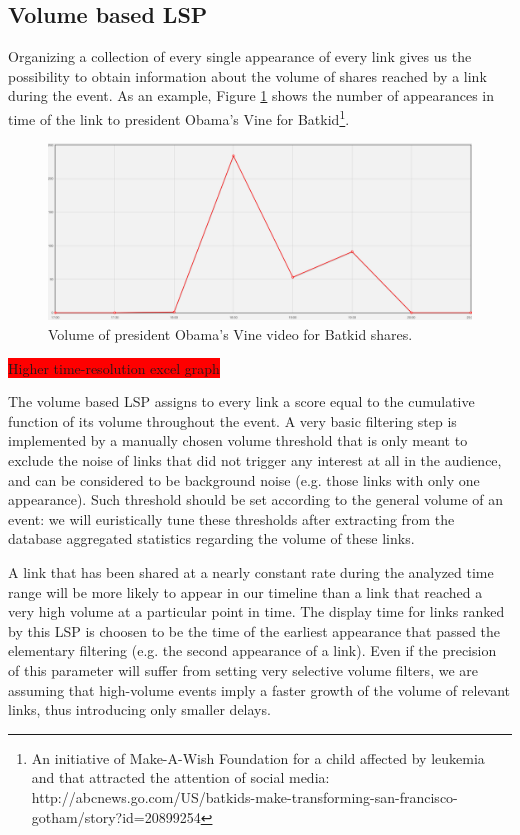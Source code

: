\documentclass{sig-alternate}
\newcommand{\todo}[1]{\colorbox{red}{#1}}
\begin{document}
\subsection{Volume based LSP}
\label{sec:volume_based_links_selection}
Organizing a collection of every single appearance of every link gives us the possibility to obtain information about the volume of shares reached by a link during the event. As an example, Figure \ref{fig:batkid_whitehouse_volume} shows the number of appearances in time of the link to president Obama's Vine for Batkid\footnote{An initiative of Make-A-Wish Foundation for a child affected by leukemia and that attracted the attention of social media: http://abcnews.go.com/US/batkids-make-transforming-san-francisco-gotham/story?id=20899254}.
\begin{figure}[htbp]
  \centering
  \includegraphics[width=\linewidth]{Figures/batkid_whitehouse_volume.png}
  \caption{Volume of president Obama's Vine video for Batkid shares.}
  \label{fig:batkid_whitehouse_volume}
\end{figure} \todo{Higher time-resolution excel graph}

The volume based LSP assigns to every link a score equal to the cumulative function of its volume throughout the event. A very basic filtering step is implemented by a manually chosen volume threshold that is only meant to exclude the noise of links that did not trigger any interest at all in the audience, and can be considered to be background noise (e.g. those links with only one appearance). Such threshold should be set according to the general volume of an event: we will euristically tune these thresholds after extracting from the database aggregated statistics regarding the volume of these links. 

A link that has been shared at a nearly constant rate during the analyzed time range will be more likely to appear in our timeline than a link that reached a very high volume at a particular point in time. The display time for links ranked by this LSP is choosen to be the time of the earliest appearance that passed the elementary filtering (e.g. the second appearance of a link). Even if the precision of this parameter will suffer from setting very selective volume filters, we are assuming that high-volume events imply a faster growth of the volume of relevant links, thus introducing only smaller delays.
\end{document}
